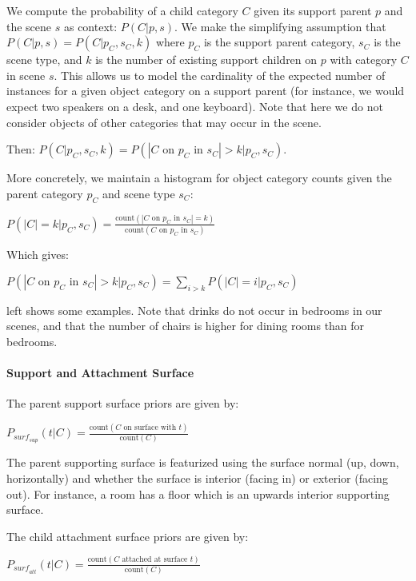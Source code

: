 \documentclass{sigchi}
\begin{document}
We compute the probability of a child category $C$ given its support parent $p$ and the scene $s$ as context: $P(C | p,s)$.  We make the simplifying assumption that $P(C | p, s) = P(C | p_C, s_C, k)$ where $p_C$ is the support parent category, $s_C$ is the scene type, and $k$ is the number of existing support children on $p$ with category $C$ in scene $s$.  This allows us to model the cardinality of the expected number of instances for a given object category on a support parent (for instance, we would expect two speakers on a desk, and one keyboard).  Note that here we do not consider objects of other categories that may occur in the scene.

Then: {\small $P(C | p_C, s_C, k) = P(| C \text{~on~} p_{C} \text{~in~} s_{C}| > k | p_C, s_C)$.}
 
More concretely, we maintain a histogram for object category counts given the parent category $p_C$ and scene type $s_C$:

{\small $P(|C|=k|p_C, s_{C}) = \frac{\text{count}(| C \text{~on~} p_{C} \text{~in~} s_{C}| = k)}{\text{count}(C \text{~on~} p_{C} \text{~in~} s_{C})}$}

Which gives:

{\small $P(|C \text{~on~} p_{C} \text{~in~} s_{C}| > k | p_C, s_C) = \sum_{i > k} P(|C|=i|p_C, s_{C})$}

 left shows some examples.  Note that drinks do not occur in bedrooms in our scenes, and that the number of chairs is higher for dining rooms than for bedrooms.

\paragraph{Support and Attachment Surface}
The parent support surface priors are given by:

{\small $P_{\textit{surf}_\textit{sup}}(t | C) = \frac{\text{count}(C \text{~on surface with~} t)}{\text{count}(C)}$}

The parent supporting surface is featurized using the surface normal (up, down, horizontally) and whether the surface is interior (facing in) or exterior (facing out).  For instance, a room has a floor which is an upwards interior supporting surface. %

The child attachment surface priors are given by:

{\small $P_{\textit{surf}_\textit{att}}(t | C) = \frac{\text{count}(C \text{~attached at surface~} t)}{\text{count}(C)}$}
\end{document}
